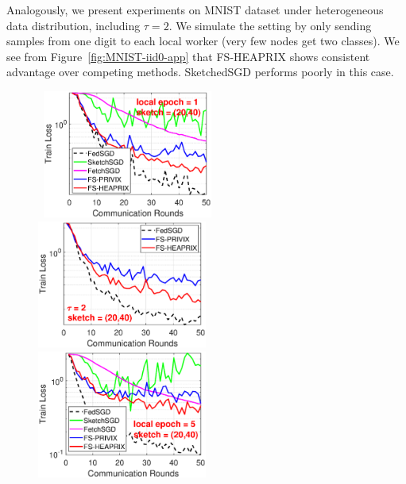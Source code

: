 \documentclass[11pt]{article}
\begin{document}
Analogously, we present experiments on MNIST dataset under heterogeneous data distribution, including $\tau=2$. We simulate the setting by only sending samples from one digit to each local worker (very few nodes get two classes). We see from Figure~\ref{fig:MNIST-iid0-app} that FS-HEAPRIX shows consistent advantage over competing methods. SketchedSGD performs poorly in this case.

\begin{figure}[h]
	\begin{center}
		\mbox{%
		\includegraphics[width=2.2in]{MNIST_figures/local1_sketch20_iid0_train_loss.eps}%
		\includegraphics[width=2.2in]{MNIST_figures/local2_sketch20_iid0_train_loss.eps}%
		\includegraphics[width=2.2in]{MNIST_figures/local5_sketch20_iid0_train_loss.eps} }
		

\end{center}
\end{figure}
\end{document}
